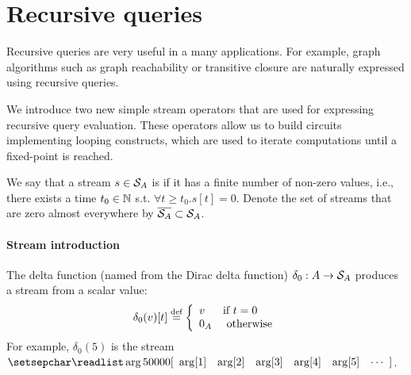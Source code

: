 \section{Recursive queries}\label{sec:recursion}

Recursive queries are very useful in a many applications.
For example, graph algorithms such as graph reachability
or transitive closure are naturally expressed using recursive queries.

We introduce two new simple stream operators that are used for
expressing recursive query evaluation.  These operators allow us
to build circuits implementing looping constructs, which 
are used to iterate computations until a fixed-point is reached.

\begin{definition}\label{def:zae}
We say that a stream $s \in \mathcal{S}_{A}$ is  if it has a finite 
number of non-zero values, i.e., there exists a time $t_0 \in \mathbb{N}$
s.t. $\forall t \geq t_0 . s[t] = 0$.
\noindent Denote the set of streams that are zero almost everywhere
by $\overline{\mathcal{S}_{A}} \subset \mathcal{S}_{A}$.
\end{definition}

\paragraph{Stream introduction}

The delta function (named from the Dirac delta function) $\delta_0 : A \rightarrow \mathcal{S}_{A}$
produces a stream from a scalar value:
$$\delta_0(v)[t] \stackrel{\textrm{\scriptsize def}}{=} \left\{
\begin{array}{ll}
  v & \mbox{if } t = 0 \\
  0_A & \mbox{ otherwise}
\end{array}
\right.
$$
\ifstreamexamples
For example, $\delta_0(5)$ is the stream $\sv{5 0 0 0 0}$.
\fi

\begin{comment}
Here is a diagram showing a $\delta_0$ operator; note that the input is a scalar value,
while the output is a stream:  

\begin{tikzpicture}[auto,node distance=1cm,>=latex]
    \node[] (input) {$i$};
    \node[block, right of=input] (delta) {$\delta_0$};
    \node[right of=delta] (output) {$o$};
    \draw[->] (input) -- (delta);
    \draw[->] (delta) -- (output);
\end{tikzpicture}
\end{comment}

